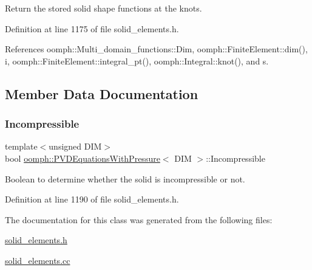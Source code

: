Return the stored solid shape functions at the knots. 



Definition at line 1175 of file solid\+\_\+elements.\+h.



References oomph\+::\+Multi\+\_\+domain\+\_\+functions\+::\+Dim, oomph\+::\+Finite\+Element\+::dim(), i, oomph\+::\+Finite\+Element\+::integral\+\_\+pt(), oomph\+::\+Integral\+::knot(), and s.



\subsection{Member Data Documentation}
\mbox{\label{classoomph_1_1PVDEquationsWithPressure_aac3148726106893e282a4d400f24522b}} 
\subsubsection{\texorpdfstring{Incompressible}{Incompressible}}
{\footnotesize\ttfamily template$<$unsigned D\+IM$>$ \\
bool \hyperlink{classoomph_1_1PVDEquationsWithPressure}{oomph\+::\+P\+V\+D\+Equations\+With\+Pressure}$<$ D\+IM $>$\+::Incompressible\hspace{0.3cm}{\ttfamily [protected]}}



Boolean to determine whether the solid is incompressible or not. 



Definition at line 1190 of file solid\+\_\+elements.\+h.



The documentation for this class was generated from the following files\+:\begin{DoxyCompactItemize}
\item 
\hyperlink{solid__elements_8h}{solid\+\_\+elements.\+h}\item 
\hyperlink{solid__elements_8cc}{solid\+\_\+elements.\+cc}\end{DoxyCompactItemize}
